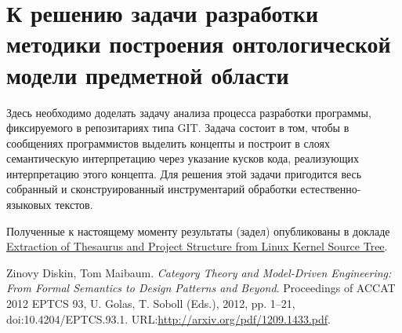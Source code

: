 \documentclass[11pt,draft]{ltxdoc}
\begin{document}
\section{К решению задачи разработки методики построения онтологической модели предметной области}
\label{sec:technique-onto}

Здесь необходимо доделать задачу анализа процесса разработки программы,
фиксируемого в репозитариях типа GIT\@.  Задача состоит в том, чтобы в сообщениях
программистов выделить концепты и построит в слоях семантическую интерпретацию
через указание кусков кода, реализующих интерпретацию этого концепта. Для
решения этой задачи пригодится весь собранный и сконструированный инструментарий
обработки естественно-языковых текстов.

Полученные к настоящему моменту результаты (задел) опубликованы в докладе \href{http://mipro-proceedings.com/sites/mipro-proceedings.com/files/upload/cis/cis_025.pdf}{Extraction of Thesaurus and Project Structure from Linux Kernel Source Tree}.

\begin{thebibliography}{9}
 Zinovy Diskin, Tom Maibaum. \emph{Category Theory and
    Model-Driven Engineering: From Formal Semantics to Design Patterns and Beyond}. Proceedings of ACCAT 2012
EPTCS 93, U. Golas, T. Soboll (Eds.), 2012, pp. 1–21, doi:10.4204/EPTCS.93.1. URL:\url{http://arxiv.org/pdf/1209.1433.pdf}.
\end{thebibliography}




\end{document}
